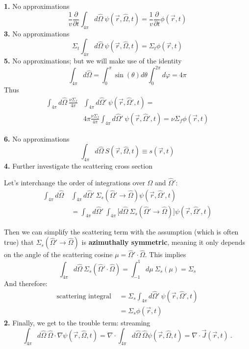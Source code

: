 \documentclass[12pt]{article}
\newcommand{\vOmega}{\ensuremath{\hat{\Omega}}}
\begin{document}
\textbf{1.} No approximations
\begin{equation}
\frac{1}{v}\frac{\partial}{\partial t} \int_{4\pi} d\vOmega \: \psi(\vec{r}, \vOmega, t) = \boxed{\frac{1}{v}\frac{\partial}{\partial t}\phi(\vec{r}, t)}\nonumber
\end{equation}
\textbf{3.} No approximations
\begin{equation}
\Sigma_t \int_{4\pi} d\vOmega \:\psi(\vec{r}, \vOmega, t) = \boxed{\Sigma_t \phi(\vec{r}, t)} \nonumber 
\end{equation}
\textbf{5.} No approximations; but we will make use of the identity
\[\int_{4\pi} d\vOmega = \int_0^{\pi} \sin(\theta) d\theta \int_0^{2\pi} d\varphi = 4\pi \]
Thus
\begin{align*}
\int_{4\pi} d\vOmega\: \frac{\nu \Sigma_f}{4\pi} &\int_{4\pi} d\vOmega' \:\psi(\vec{r},\vOmega', t) = \\
& 4\pi \frac{\nu \Sigma_f}{4\pi} \int_{4\pi} d\vOmega'\: \psi(\vec{r},\vOmega', t) = \boxed{\nu \Sigma_f \phi(\vec{r}, t)}
\end{align*}

\textbf{6.} No approximations
\begin{equation}
\int_{4\pi} d\vOmega \:S(\vec{r}, \vOmega, t) \equiv \boxed{s(\vec{r}, t)} \nonumber
\end{equation}
\textbf{4.} Further investigate the scattering cross section

Let's interchange the order of integrations over $\vOmega$ and $\vOmega'$:
%
\begin{align*}
\int_{4\pi} d\vOmega\: &\int_{4\pi} d\vOmega'\: \Sigma_s(\vOmega' \rightarrow \vOmega) \psi(\vec{r}, \vOmega', t)\\
%
&= \int_{4\pi} d\vOmega'\: \int_{4\pi} \bigl[ d\vOmega\: \Sigma_s(\vOmega' \rightarrow \vOmega)\bigr] \psi(\vec{r}, \vOmega', t)
\end{align*}

Then we can simplify the scattering term with the assumption (which is often true) that $\Sigma_s(\vOmega' \rightarrow \vOmega)$ is \textbf{azimuthally symmetric}, meaning it only depends on the angle of the scattering cosine $\mu =\vOmega' \cdot \vOmega$.  This implies
\[\int_{4\pi} d\vOmega \:\Sigma_s(\vOmega' \cdot \vOmega) = \int_{-1}^{1} d\mu\: \Sigma_s(\mu) = \Sigma_s\]
%
And therefore:
%
\begin{align*}
\text{scattering integral }&= \Sigma_s \int_{4\pi} d\vOmega'\: \psi(\vec{r}, \vOmega', t) \\
%
&= \boxed{\Sigma_s \phi(\vec{r}, t)}
\end{align*}
\textbf{2.} Finally, we get to the trouble term: streaming
%
\[\int_{4\pi} d\vOmega \:\vOmega \cdot \nabla \psi(\vec{r}, \vOmega, t) = \nabla \cdot \int_{4\pi} d\vOmega \:\vOmega \psi(\vec{r}, \vOmega, t) = \nabla \cdot \vec{J}(\vec{r}, t)\:. \]
\end{document}
